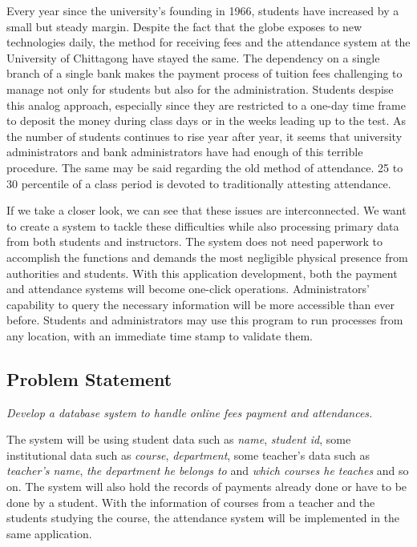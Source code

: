 Every year since the university's founding in 1966, students have increased by a small but steady margin. Despite the fact that the globe exposes to new technologies daily, the method for receiving fees and the attendance system at the University of Chittagong have stayed the same. The dependency on a single branch of a single bank makes the payment process of tuition fees challenging to manage not only for students but also for the administration. Students despise this analog approach, especially since they are restricted to a one-day time frame to deposit the money during class days or in the weeks leading up to the test. As the number of students continues to rise year after year, it seems that university administrators and bank administrators have had enough of this terrible procedure. The same may be said regarding the old method of attendance. 25 to 30 percentile of a class period is devoted to traditionally attesting attendance.

If we take a closer look, we can see that these issues are interconnected. We want to create a system to tackle these difficulties while also processing primary data from both students and instructors. The system does not need paperwork to accomplish the functions and demands the most negligible physical presence from authorities and students. With this application development, both the payment and attendance systems will become one-click operations. Administrators' capability to query the necessary information will be more accessible than ever before. Students and administrators may use this program to run processes from any location, with an immediate time stamp to validate them.

\subsection{Problem Statement}\label{subsec:ps} 

\emph{Develop a database system to handle online fees payment and attendances.}

The system will be using student data such as \emph{name}, \emph{student id}, some institutional data such as \emph{course}, \emph{department}, some teacher's data such as \emph{teacher's name}, \emph{the department he belongs to} and \emph{which courses he teaches} and so on. The system will also hold the records of payments already done or have to be done by a student. With the information of courses from a teacher and the students studying the course, the attendance system will be implemented in the same application.

